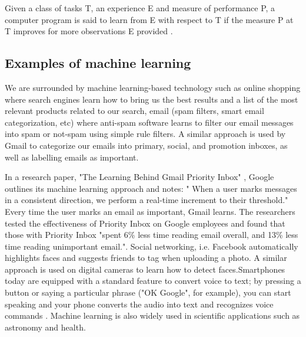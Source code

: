 Given a class of tasks T, an experience E and measure of performance P, a computer program is said to learn from E with respect to T if the measure P at T improves for more observations E provided \citep{michalski2013machine}. 
\subsection{Examples of machine learning}

We are surrounded by machine learning-based technology such as online shopping where  search engines learn how to bring us the best results and a list of the most relevant products related to our search, email (spam filters, smart email categorization, etc)  where anti-spam software learns to filter our email messages into spam or not-spam using simple rule filters. A similar approach is used by Gmail to categorize our emails into primary, social, and promotion inboxes, as well as labelling emails as important. 

In a research paper, "The Learning Behind Gmail Priority Inbox" \citep{aberdeen2010learning}, Google outlines its machine learning approach  and notes: " When a user marks messages in a consistent direction, we perform a real-time increment to their threshold." Every time the user marks an email as important, Gmail learns. The researchers tested the effectiveness of Priority Inbox on Google employees and found that those with Priority Inbox "spent 6\% less time reading email overall, and 13\% less time reading unimportant email.". Social networking, i.e. Facebook  automatically highlights faces and suggests friends to tag when uploading a photo. A similar approach is used on digital cameras to learn how to detect faces.Smartphones today are equipped with a standard feature to convert voice to text; by pressing a button or saying a particular phrase ("OK Google", for example), you can start speaking and your phone converts the audio into text and recognizes voice commands \citep{Techemergence}.  
Machine learning is also widely used in scientific applications such as astronomy and health.


